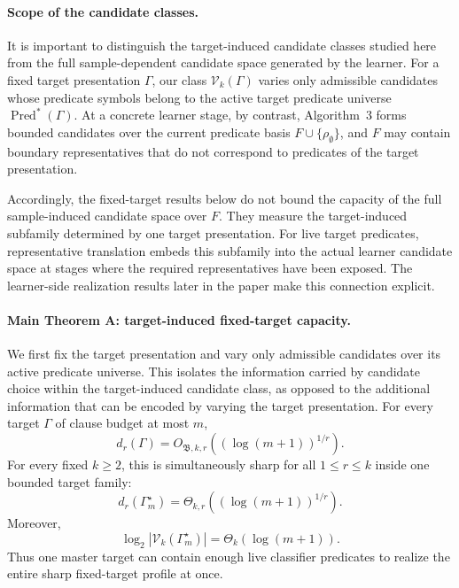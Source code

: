 \documentclass[11pt]{article}
\theoremstyle{definition}
\theoremstyle{remark}
\newcommand{\Pred}{\operatorname{Pred}}
\begin{document}
\paragraph{Scope of the candidate classes.}
It is important to distinguish the target-induced candidate classes studied
here from the full sample-dependent candidate space generated by the learner.
For a fixed target presentation \(\Gamma\), our class
\(\mathcal V_k(\Gamma)\) varies only admissible candidates whose predicate
symbols belong to the active target predicate universe
\(\Pred^\ast(\Gamma)\).  At a concrete learner stage, by contrast,
Algorithm~3 forms bounded candidates over the current predicate basis
\(F\cup\{\rho_\emptyset\}\), and \(F\) may contain boundary
representatives that do not correspond to predicates of the target
presentation.

Accordingly, the fixed-target results below do not bound the capacity of the
full sample-induced candidate space over \(F\).  They measure the
target-induced subfamily determined by one target presentation.  For live
target predicates, representative translation embeds this subfamily into the
actual learner candidate space at stages where the required representatives
have been exposed.  The learner-side realization results later in the paper
make this connection explicit.

\paragraph{Main Theorem A: target-induced fixed-target capacity.}
We first fix the target presentation and vary only admissible candidates over
its active predicate universe.  This isolates the information carried by
candidate choice within the target-induced candidate class, as opposed to the
additional information that can be encoded by varying the target
presentation.  For every target \(\Gamma\) of clause budget at most \(m\),
\[
d_r(\Gamma)
=
O_{\mathfrak B,k,r}((\log(m+1))^{1/r}).
\]
For every fixed \(k\ge2\), this is simultaneously sharp for all
\(1\le r\le k\) inside one bounded target family:
\[
\boxed{
d_r(\Gamma_m^\star)
=
\Theta_{k,r}((\log(m+1))^{1/r}).
}
\]
Moreover,
\[
\boxed{
\log_2|\mathcal V_k(\Gamma_m^\star)|
=
\Theta_k(\log(m+1)).
}
\]
Thus one master target can contain enough live classifier predicates to
realize the entire sharp fixed-target profile at once.
\end{document}
